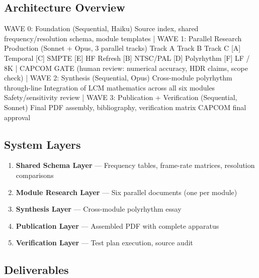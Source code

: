 \documentclass[11pt,letterpaper]{article}
\begin{document}
\subsection{Architecture Overview}

\begin{asciibox}
  WAVE 0: Foundation (Sequential, Haiku)
    Source index, shared frequency/resolution schema, module templates
                |
  WAVE 1: Parallel Research Production (Sonnet + Opus, 3 parallel tracks)
    Track A         Track B         Track C
    [A] Temporal    [C] SMPTE       [E] HF Refresh
    [B] NTSC/PAL    [D] Polyrhythm  [F] LF / 8K
                |
  CAPCOM GATE (human review: numerical accuracy, HDR claims, scope check)
                |
  WAVE 2: Synthesis (Sequential, Opus)
    Cross-module polyrhythm through-line
    Integration of LCM mathematics across all six modules
    Safety/sensitivity review
                |
  WAVE 3: Publication + Verification (Sequential, Sonnet)
    Final PDF assembly, bibliography, verification matrix
    CAPCOM final approval
\end{asciibox}

\subsection{System Layers}

\begin{enumerate}[leftmargin=*, label=\textbf{L\arabic*.}]
  \item \textbf{Shared Schema Layer} --- Frequency tables, frame-rate matrices, resolution comparisons
  \item \textbf{Module Research Layer} --- Six parallel documents (one per module)
  \item \textbf{Synthesis Layer} --- Cross-module polyrhythm essay
  \item \textbf{Publication Layer} --- Assembled PDF with complete apparatus
  \item \textbf{Verification Layer} --- Test plan execution, source audit
\end{enumerate}

\subsection{Deliverables}
\end{document}
